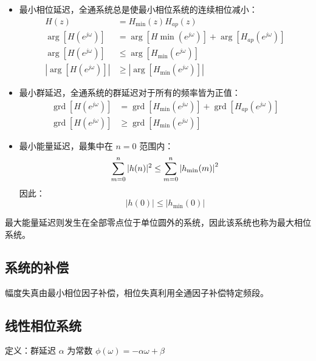 \documentclass[cn,11pt,chinese,black,simple]{elegantbook}
\begin{document}
\begin{itemize}
    \item 最小相位延迟，全通系统总是使最小相位系统的连续相位减小：\[
        \begin{aligned}
            H(z)&=H_{\min }(z) H_{a p}(z)\\ 
            \arg \left[H\left(e^{j \omega}\right)\right]&=\arg \left[H \min \left(e^{j \omega}\right)\right]+\arg \left[H_{a p}\left(e^{j \omega}\right)\right] \\
            \arg \left[H\left(e^{j \omega}\right)\right] &\leq \arg \left[H_{\min }\left(e^{j \omega}\right)\right] \\
            \left|\arg \left[H\left(e^{j \omega}\right)\right]\right| &\geq\left|\arg \left[H_{\min }\left(e^{j \omega}\right)\right]\right| 
        \end{aligned}
        \]
    \item 最小群延迟，全通系统的群延迟对于所有的频率皆为正值：\[
    \begin{aligned}
        \operatorname{grd}\left[H\left(e^{j \omega}\right)\right]&=\operatorname{grd}\left[H_{\min }\left(e^{j \omega}\right)\right]+\operatorname{grd}\left[H_{a p}\left(e^{j \omega}\right)\right]\\
        \operatorname{grd}\left[H\left(e^{j \omega}\right)\right] &\geq \operatorname{grd}\left[H_{\min }\left(e^{j \omega}\right)\right]
    \end{aligned}
        \]
    \item 最小能量延迟，最集中在 \(n = 0\) 范围内：\[
        \displaystyle\sum_{m=0}^{n}|h(n)|^{2} \leq \displaystyle\sum_{m=0}^{n}\left|h_{\min }(m)\right|^{2}
        \] 
        因此：\[
            |h(0)| \leq\left|h_{\min }(0)\right|
            \]
\end{itemize}

最大能量延迟则发生在全部零点位于单位圆外的系统，因此该系统也称为最大相位系统。

\subsection{系统的补偿}

幅度失真由最小相位因子补偿，相位失真利用全通因子补偿特定频段。

\subsection{线性相位系统}

定义：群延迟 \(\alpha\) 为常数 \(\phi(\omega) = - \alpha \omega + \beta\)
\end{document}
